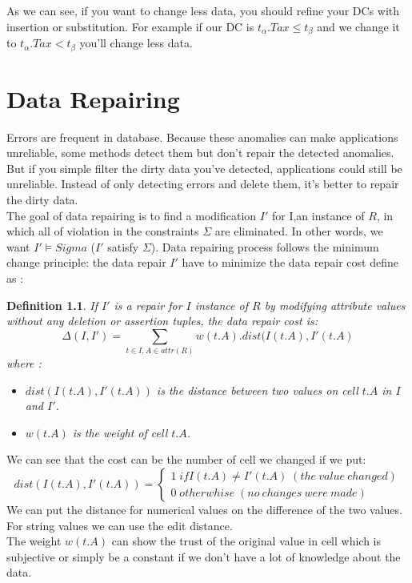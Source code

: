 \documentclass[letterpaper, 12pt]{report}
\newtheorem{mydef}{Definition}
\begin{document}
As we can see, if you want to change less data, you should refine your DCs with insertion or substitution. For example if our DC is $t_\alpha.Tax \leq t_\beta$ and we change it to $t_\alpha.Tax < t_\beta$ you'll change less data.

\chapter{Data Repairing}

Errors are frequent in database. Because these anomalies can make applications unreliable, some methods detect them but don't repair the detected anomalies. But if you simple filter the dirty data you've detected, applications could still be unreliable. \cite{anodetect} Instead of only detecting errors and delete them, it's better to repair the dirty data.\\

The goal of data repairing is to find a modification $I'$ for I,an instance of $R$, in which all of violation in the constraints $\Sigma$ are eliminated. In other words, we want $I' \models Sigma$ ($I'$ satisfy $\Sigma$). Data repairing process follows the minimum change principle: the data repair $I'$ have to minimize the data repair cost define as \cite{main}:
\begin{mydef}
If $I'$ is a repair for $I$ instance of $R$ by modifying attribute values without any deletion or assertion tuples, the data repair cost is:
$$ \Delta(I,I') = \sum_{t \in I, A \in attr(R)} w(t.A).dist(I(t.A),I'(t.A) $$
where :
\begin{itemize}
	\item $dist(I(t.A),I'(t.A))$ is the distance between two values on cell $t.A$ in $I$ and $I'$.
	\item $w(t.A)$ is the weight of cell $t.A$.
\end{itemize}
\end{mydef}

We can see that the cost can be the number of cell we changed if we put:
$$
dist(I(t.A),I'(t.A)) =
\left\{
	\begin{array}{ll}
	  1 \; if I(t.A) \neq I'(t.A)\;(the\ value\ changed) \\
	  0 \; otherwhise\;(no\ changes\ were\ made)
	\end{array}
\right.
$$
We can put the distance for numerical values on the difference of the two values. For string values we can use the edit distance.\\

The weight $w(t.A)$ can show the trust of the original value in cell which is subjective or simply be a constant if we don't have a lot of knowledge about the data.\\
\end{document}

